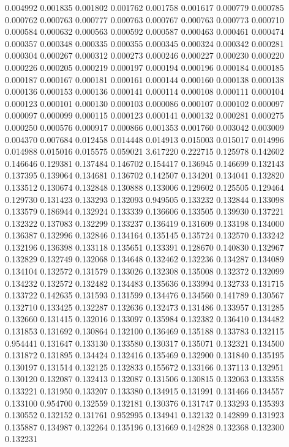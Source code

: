 0.004992
0.001835
0.001802
0.001762
0.001758
0.001617
0.000779
0.000785
0.000762
0.000763
0.000777
0.000763
0.000767
0.000763
0.000773
0.000710
0.000584
0.000632
0.000563
0.000592
0.000587
0.000463
0.000461
0.000474
0.000357
0.000348
0.000335
0.000355
0.000345
0.000324
0.000342
0.000281
0.000304
0.000267
0.000312
0.000273
0.000246
0.000227
0.000230
0.000220
0.000226
0.000205
0.000219
0.000197
0.000194
0.000196
0.000184
0.000185
0.000187
0.000167
0.000181
0.000161
0.000144
0.000160
0.000138
0.000138
0.000136
0.000153
0.000136
0.000141
0.000114
0.000108
0.000111
0.000104
0.000123
0.000101
0.000130
0.000103
0.000086
0.000107
0.000102
0.000097
0.000097
0.000099
0.000115
0.000123
0.000141
0.000132
0.000281
0.000275
0.000250
0.000576
0.000917
0.000866
0.001353
0.001760
0.003042
0.003009
0.004370
0.007684
0.012458
0.014448
0.014913
0.015003
0.015017
0.014996
0.014988
0.015016
0.015575
0.059021
3.617220
0.222715
0.125978
0.142602
0.146646
0.129381
0.137484
0.146702
0.154417
0.136945
0.146699
0.132143
0.137395
0.139064
0.134681
0.136702
0.142507
0.134201
0.134041
0.132820
0.133512
0.130674
0.132848
0.130888
0.133006
0.129602
0.125505
0.129464
0.129730
0.131423
0.133293
0.132093
0.949505
0.133232
0.132844
0.133098
0.133579
0.186944
0.132924
0.133339
0.136606
0.133505
0.139930
0.137221
0.132322
0.137083
0.132299
0.133237
0.136419
0.131609
0.133198
0.134000
0.136387
0.132996
0.132846
0.134164
0.135145
0.135724
0.132570
0.133242
0.132196
0.136398
0.133118
0.135651
0.133391
0.128670
0.140830
0.132967
0.132829
0.132749
0.132068
0.134648
0.132462
0.132236
0.134287
0.134089
0.134104
0.132572
0.131579
0.133026
0.132308
0.135008
0.132372
0.132099
0.134232
0.132572
0.132482
0.134483
0.135636
0.133994
0.132733
0.131715
0.133722
0.142635
0.131593
0.131599
0.134476
0.134560
0.141789
0.130567
0.132710
0.133425
0.132287
0.132636
0.132473
0.131486
0.133957
0.131285
0.132660
0.131415
0.132016
0.133097
0.135984
0.132382
0.136410
0.134482
0.131853
0.131692
0.130864
0.132100
0.136469
0.135188
0.133783
0.132115
0.954441
0.131647
0.133130
0.133580
0.130317
0.135071
0.132321
0.134500
0.131872
0.131895
0.134424
0.132416
0.135469
0.132900
0.131840
0.135195
0.130197
0.131514
0.132125
0.132833
0.155672
0.133166
0.137113
0.132951
0.130120
0.132087
0.132413
0.132087
0.131506
0.130815
0.132063
0.133358
0.133221
0.131950
0.133207
0.133380
0.134915
0.131991
0.131466
0.134557
0.133100
0.954700
0.132559
0.132181
0.130376
0.131747
0.133293
0.135393
0.130552
0.132152
0.131761
0.952995
0.134941
0.132132
0.142899
0.131923
0.135887
0.134987
0.132264
0.135196
0.131669
0.142828
0.132368
0.132300
0.132231
